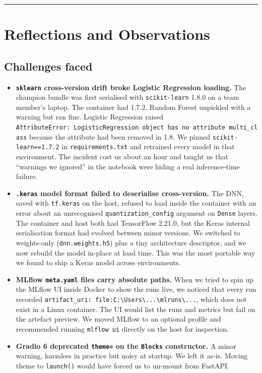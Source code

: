 \begin{center}\rule{0.5\linewidth}{0.5pt}\end{center}

\section{Reflections and
Observations}\label{reflections-and-observations}

\subsection{Challenges faced}\label{challenges-faced}

\begin{itemize}
\item
  \textbf{\texttt{sklearn} cross-version drift broke Logistic Regression
  loading.} The champion bundle was first serialised with
  \texttt{scikit-learn} 1.8.0 on a team member's laptop. The container
  had 1.7.2. Random Forest unpickled with a warning but ran fine.
  Logistic Regression raised
  \texttt{AttributeError:\ \textquotesingle{}LogisticRegression\textquotesingle{}\ object\ has\ no\ attribute\ \textquotesingle{}multi\_class\textquotesingle{}}
  because the attribute had been removed in 1.8. We pinned
  \texttt{scikit-learn==1.7.2} in \texttt{requirements.txt} and
  retrained every model in that environment. The incident cost us about
  an hour and taught us that ``warnings we ignored'' in the notebook
  were hiding a real inference-time failure.
\item
  \textbf{\texttt{.keras} model format failed to deserialise
  cross-version.} The DNN, saved with \texttt{tf.keras} on the host,
  refused to load inside the container with an error about an
  unrecognised \texttt{quantization\_config} argument on \texttt{Dense}
  layers. The container and host both had TensorFlow 2.21.0, but the
  Keras internal serialisation format had evolved between minor
  versions. We switched to weights-only (\texttt{dnn.weights.h5}) plus a
  tiny architecture descriptor, and we now rebuild the model in-place at
  load time. This was the most portable way we found to ship a Keras
  model across environments.
\item
  \textbf{MLflow \texttt{meta.yaml} files carry absolute paths.} When we
  tried to spin up the MLflow UI inside Docker to show the runs live, we
  noticed that every run recorded
  \texttt{artifact\_uri:\ file:C:\textbackslash{}Users\textbackslash{}...\textbackslash{}mlruns\textbackslash{}...},
  which does not exist in a Linux container. The UI would list the runs
  and metrics but fail on the artefact preview. We moved MLflow to an
  optional profile and recommended running \texttt{mlflow\ ui} directly
  on the host for inspection.
\item
  \textbf{Gradio 6 deprecated \texttt{theme=} on the \texttt{Blocks}
  constructor.} A minor warning, harmless in practice but noisy at
  startup. We left it as-is. Moving theme to \texttt{launch()} would
  have forced us to un-mount from FastAPI.
\end{itemize}

